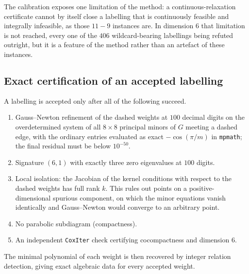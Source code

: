 \documentclass[11pt,reqno]{amsart}
\theoremstyle{plain}
\theoremstyle{definition}
\newcommand{\Gr}{G}
\newcommand{\DFiveWildSurvived}{9}
\newcommand{\DFiveWildScreenPass}{11}
\newcommand{\NumWild}{406}
\begin{document}
The calibration exposes one limitation of the method: a continuous-relaxation
certificate cannot by itself close a labelling that is continuously feasible and
integrally infeasible, as those
$\DFiveWildScreenPass-\DFiveWildSurvived$ instances are. In dimension $6$ that
limitation is not reached, every one of the $\NumWild$ wildcard-bearing labellings
being refuted outright, but it is a feature of the method rather than an artefact
of these instances.

\subsection{Exact certification of an accepted labelling}
\label{sec:exactcert}
A labelling is accepted only after all of the following succeed.
\begin{enumerate}
\item Gauss--Newton refinement of the dashed weights at $100$ decimal digits on
      the overdetermined system of all $8\times8$ principal minors of $\Gr$
      meeting a dashed edge, with the ordinary entries evaluated as exact
      $-\cos(\pi/m)$ in \texttt{mpmath}; the final residual must be below
      $10^{-50}$.
\item Signature $(6,1)$ with exactly three zero eigenvalues at $100$ digits.
\item Local isolation: the Jacobian of the kernel conditions with respect to the
      dashed weights has full rank $k$. This rules out points on a
      positive-dimensional spurious component, on which the minor equations
      vanish identically and Gauss--Newton would converge to an arbitrary point.
\item No parabolic subdiagram (compactness).
\item An independent \texttt{CoxIter} \cite{Guglielmetti2017,GuglielmettiLMS2015}
      check certifying cocompactness and dimension $6$.
\end{enumerate}
The minimal polynomial of each weight is then recovered by integer relation
detection, giving exact algebraic data for every accepted weight.
\end{document}
